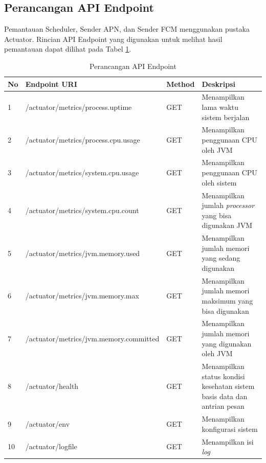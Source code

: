\subsection{Perancangan API Endpoint}
\par Pemantauan Scheduler, Sender APN, dan Sender FCM menggunakan pustaka Actuator. Rincian API Endpoint yang digunakan untuk melihat hasil pemantauan dapat dilihat pada Tabel \ref{t:rancangan_api}.
\begin{longtable}[H]{|p{0.5cm}|p{3.5cm}|p{1.2cm}|p{3.5cm}|}
	\caption{Perancangan API Endpoint} \label{t:rancangan_api} \\ \hline
	\rowcolor{lightgray} No & Endpoint URI & Method & Deskripsi \\ \hline
	1 & /actuator/metrics/\newline process.uptime & GET & Menampilkan lama waktu sistem berjalan \\ \hline
	2 & /actuator/metrics/\newline process.cpu.usage & GET & Menampilkan penggunaan CPU oleh JVM \\ \hline
	3 & /actuator/metrics/\newline system.cpu.usage & GET & Menampilkan penggunaan CPU oleh sistem \\ \hline
	4 & /actuator/metrics/\newline system.cpu.count & GET & Menampilkan jumlah \textit{processor} yang bisa digunakan JVM \\ \hline
	5 & /actuator/metrics/\newline jvm.memory.used & GET & Menampilkan jumlah memori yang sedang digunakan \\ \hline
	6 & /actuator/metrics/\newline jvm.memory.max & GET & Menampilkan jumlah memori maksimum yang bisa digunakan \\ \hline
	7 & /actuator/metrics/\newline jvm.memory.committed & GET & Menampilkan jumlah memori yang digunakan oleh JVM \\ \hline
	8 & /actuator/health & GET & Menampilkan status kondisi kesehatan sistem basis data dan antrian pesan \\ \hline
	9 & /actuator/env & GET & Menampilkan konfigurasi sistem \\ \hline
	10 & /actuator/logfile & GET & Menampilkan isi \textit{log} \\ \hline
\end{longtable}
